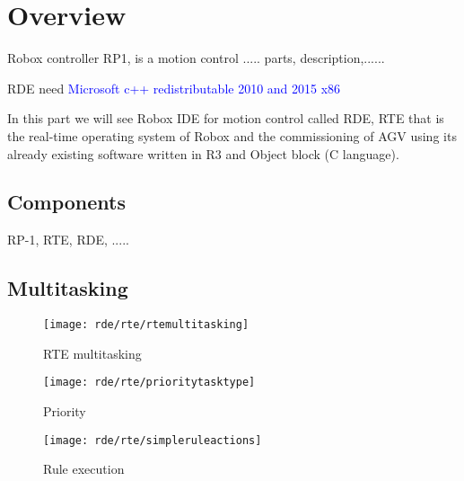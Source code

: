 

\chapter{Overview}
Robox controller RP1, is a motion control ..... parts, description,......

RDE need \textcolor{blue}{Microsoft c++ redistributable 2010 and 2015 x86}

In this part we will see Robox IDE for motion control called RDE, RTE that is the real-time operating system of Robox and the commissioning of AGV using its already existing software written in R3 and Object block (C language).

\section{Components}
RP-1, RTE, RDE, .....

\section{Multitasking}

\begin{figure}
	\centering\texttt{[image: rde/rte/rtemultitasking]}
	\caption{RTE multitasking}
	\label{rtemultitasking}
\end{figure}

\begin{figure}
	\centering\texttt{[image: rde/rte/prioritytasktype]}
	\caption{Priority}
	\label{prioritytasktype}
\end{figure}

\begin{figure}
	\centering\texttt{[image: rde/rte/simpleruleactions]}
	\caption{Rule execution}
	\label{simpleruleactions}
\end{figure}
